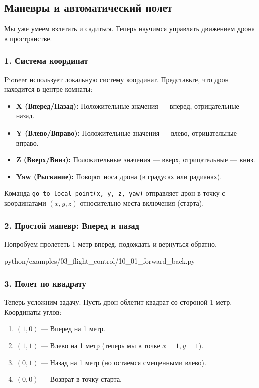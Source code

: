 \subsection{Маневры и автоматический полет}

Мы уже умеем взлетать и садиться. Теперь научимся управлять движением дрона в пространстве.

\subsubsection*{1. Система координат}
Pioneer использует локальную систему координат. Представьте, что дрон находится в центре комнаты:
\begin{itemize}
    \item \textbf{X (Вперед/Назад):} Положительные значения — вперед, отрицательные — назад.
    \item \textbf{Y (Влево/Вправо):} Положительные значения — влево, отрицательные — вправо.
    \item \textbf{Z (Вверх/Вниз):} Положительные значения — вверх, отрицательные — вниз.
    \item \textbf{Yaw (Рыскание):} Поворот носа дрона (в градусах или радианах).
\end{itemize}

Команда \texttt{go\_to\_local\_point(x, y, z, yaw)} отправляет дрон в точку с координатами $(x, y, z)$ относительно места включения (старта).

\subsubsection*{2. Простой маневр: Вперед и назад}
Попробуем пролететь 1 метр вперед, подождать и вернуться обратно.

\begin{codefile}[python]{python/examples/03_flight_control/10_01_forward_back.py}
\end{codefile}

\subsubsection*{3. Полет по квадрату}
Теперь усложним задачу. Пусть дрон облетит квадрат со стороной 1 метр.
Координаты углов:
\begin{enumerate}
    \item $(1, 0)$ — Вперед на 1 метр.
    \item $(1, 1)$ — Влево на 1 метр (теперь мы в точке $x=1, y=1$).
    \item $(0, 1)$ — Назад на 1 метр (но остаемся смещенными влево).
    \item $(0, 0)$ — Возврат в точку старта.
\end{enumerate}

